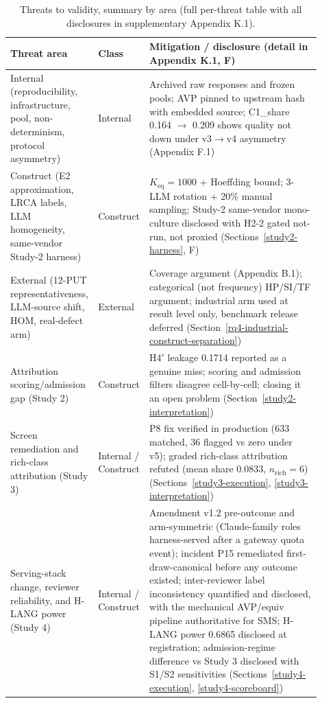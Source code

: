\documentclass[manuscript,screen,review]{acmart}
\begin{document}
\begin{table}[t]
\caption{Threats to validity, summary by area (full per-threat table with
all disclosures in supplementary Appendix K.1).}\label{tab:p2-14}
\centering
\small
\begin{tabular}{p{0.22\linewidth}p{0.12\linewidth}p{0.56\linewidth}}
\toprule
Threat area & Class & Mitigation / disclosure (detail in Appendix K.1, F) \\
\midrule
Internal (reproducibility, infrastructure, pool, non-determinism, protocol
asymmetry) & Internal & Archived raw responses and frozen pools; AVP pinned to
upstream hash with embedded source; C1\_share 0.164 $\to$ 0.209 shows quality
not down under v3$\to$v4 asymmetry (Appendix F.1) \\
Construct (E2 approximation, LRCA labels, LLM homogeneity, same-vendor
Study-2 harness) & Construct & $K_{\mathrm{eq}}=1000$ + Hoeffding bound; 3-LLM
rotation + 20\% manual sampling; Study-2 same-vendor mono-culture disclosed with
H2-2 gated not-run, not proxied (Sections~\ref{study2-harness}, F) \\
External (12-PUT representativeness, LLM-source shift, HOM, real-defect arm) &
External & Coverage argument (Appendix B.1); categorical (not frequency) HP/SI/TF
argument; industrial arm used at result level only, benchmark release deferred
(Section~\ref{rq4-industrial-construct-separation}) \\
Attribution scoring/admission gap (Study 2) & Construct & H4\('\) leakage 0.1714
reported as a genuine miss; scoring and admission filters disagree cell-by-cell;
closing it an open problem (Section~\ref{study2-interpretation}) \\
Screen remediation and rich-class attribution (Study 3) & Internal / Construct &
P8 fix verified in production (633 matched, 36 flagged vs zero under v5); graded
rich-class attribution refuted (mean share 0.0833, $n_{\mathrm{rich}}=6$)
(Sections~\ref{study3-execution}, \ref{study3-interpretation}) \\
Serving-stack change, reviewer reliability, and H-LANG power (Study 4) &
Internal / Construct & Amendment v1.2 pre-outcome and arm-symmetric
(Claude-family roles harness-served after a gateway quota event); incident P15
remediated first-draw-canonical before any outcome existed; inter-reviewer
label inconsistency quantified and disclosed, with the mechanical AVP/equiv
pipeline authoritative for SMS; H-LANG power 0.6865 disclosed at registration;
admission-regime difference vs Study 3 disclosed with S1/S2 sensitivities
(Sections~\ref{study4-execution}, \ref{study4-scoreboard}) \\
\bottomrule
\end{tabular}
\normalsize
\end{table}
\end{document}
